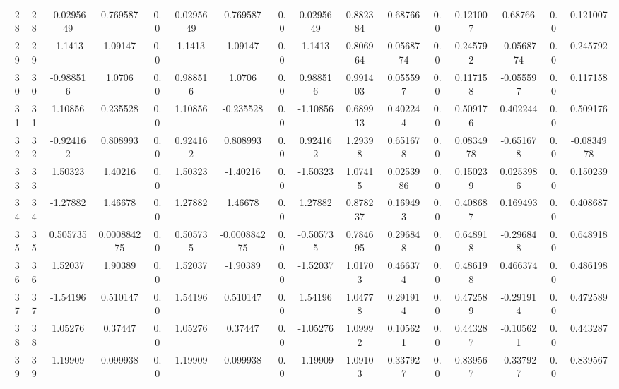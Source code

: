 \begin{tabular}{r|ccccccccccccccc}
	28 & 28 & -0.0295649 & 0.769587 & 0.0 & 0.0295649 & 0.769587 & 0.0 & 0.0295649 & 0.882384 & 0.68766 & 0.0 & 0.121007 & 0.68766 & 0.0 & 0.121007 \\
	29 & 29 & -1.1413 & 1.09147 & 0.0 & 1.1413 & 1.09147 & 0.0 & 1.1413 & 0.806964 & 0.0568774 & 0.0 & 0.245792 & -0.0568774 & 0.0 & 0.245792 \\
	30 & 30 & -0.988516 & 1.0706 & 0.0 & 0.988516 & 1.0706 & 0.0 & 0.988516 & 0.991403 & 0.055597 & 0.0 & 0.117158 & -0.055597 & 0.0 & 0.117158 \\
	31 & 31 & 1.10856 & 0.235528 & 0.0 & 1.10856 & -0.235528 & 0.0 & -1.10856 & 0.689913 & 0.402244 & 0.0 & 0.509176 & 0.402244 & 0.0 & 0.509176 \\
	32 & 32 & -0.924162 & 0.808993 & 0.0 & 0.924162 & 0.808993 & 0.0 & 0.924162 & 1.29398 & 0.651678 & 0.0 & 0.0834978 & -0.651678 & 0.0 & -0.0834978 \\
	33 & 33 & 1.50323 & 1.40216 & 0.0 & 1.50323 & -1.40216 & 0.0 & -1.50323 & 1.07415 & 0.0253986 & 0.0 & 0.150239 & 0.0253986 & 0.0 & 0.150239 \\
	34 & 34 & -1.27882 & 1.46678 & 0.0 & 1.27882 & 1.46678 & 0.0 & 1.27882 & 0.878237 & 0.169493 & 0.0 & 0.408687 & 0.169493 & 0.0 & 0.408687 \\
	35 & 35 & 0.505735 & 0.000884275 & 0.0 & 0.505735 & -0.000884275 & 0.0 & -0.505735 & 0.784695 & 0.296848 & 0.0 & 0.648918 & -0.296848 & 0.0 & 0.648918 \\
	36 & 36 & 1.52037 & 1.90389 & 0.0 & 1.52037 & -1.90389 & 0.0 & -1.52037 & 1.01703 & 0.466374 & 0.0 & 0.486198 & 0.466374 & 0.0 & 0.486198 \\
	37 & 37 & -1.54196 & 0.510147 & 0.0 & 1.54196 & 0.510147 & 0.0 & 1.54196 & 1.04778 & 0.291914 & 0.0 & 0.472589 & -0.291914 & 0.0 & 0.472589 \\
	38 & 38 & 1.05276 & 0.37447 & 0.0 & 1.05276 & 0.37447 & 0.0 & -1.05276 & 1.09992 & 0.105621 & 0.0 & 0.443287 & -0.105621 & 0.0 & 0.443287 \\
	39 & 39 & 1.19909 & 0.099938 & 0.0 & 1.19909 & 0.099938 & 0.0 & -1.19909 & 1.09103 & 0.337927 & 0.0 & 0.839567 & -0.337927 & 0.0 & 0.839567 \\
\end{tabular}
